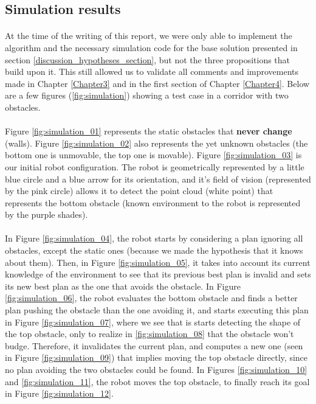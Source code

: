 \clearpage

\subsection{Simulation results}

\paragraph{} At the time of the writing of this report, we were only able to implement the algorithm and the necessary simulation code for the base solution presented in section \ref{discussion_hypotheses_section}, but not the three propositions that build upon it. This still allowed us to validate all comments and improvements made in Chapter \ref{Chapter3} and in the first section of Chapter \ref{Chapter4}. Below are a few figures (\ref{fig:simulation}) showing a test case in a corridor with two obstacles.

\paragraph{} Figure \ref{fig:simulation_01} represents the static obstacles that \textbf{never change} (walls). Figure \ref{fig:simulation_02} also represents the yet unknown obstacles (the bottom one is unmovable, the top one is movable). Figure \ref{fig:simulation_03} is our initial robot configuration. The robot is geometrically represented by a little blue circle and a blue arrow for its orientation, and it's field of vision (represented by the pink circle) allows it to detect the point cloud (white point) that represents the bottom obstacle (known environment to the robot is represented by the purple shades).

\paragraph{} In Figure \ref{fig:simulation_04}, the robot starts by considering a plan ignoring all obstacles, except the static ones (because we made the hypothesis that it knows about them). Then, in Figure \ref{fig:simulation_05}, it takes into account its current knowledge of the environment to see that its previous best plan is invalid and sets its new best plan as the one that avoids the obstacle. In Figure \ref{fig:simulation_06}, the robot evaluates the bottom obstacle and finds a better plan pushing the obstacle than the one avoiding it, and starts executing this plan in Figure \ref{fig:simulation_07}, where we see that is starts detecting the shape of the top obstacle, only to realize in \ref{fig:simulation_08} that the obstacle won't budge. Therefore, it invalidates the current plan, and computes a new one (seen in Figure \ref{fig:simulation_09}) that implies moving the top obstacle directly, since no plan avoiding the two obstacles could be found. In Figures \ref{fig:simulation_10} and \ref{fig:simulation_11}, the robot moves the top obstacle, to finally reach its goal in Figure \ref{fig:simulation_12}.

